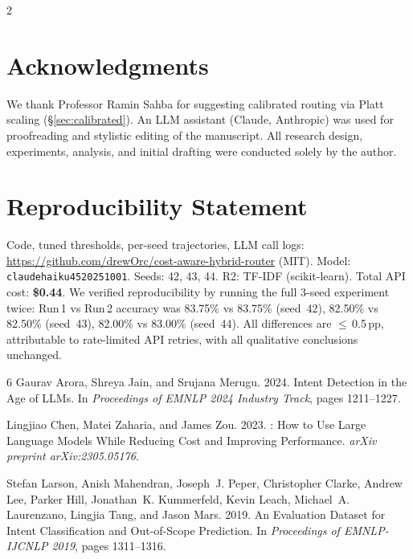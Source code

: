 \documentclass[11pt,a4paper]{article}
\begin{document}
\begin{multicols}{2}
\section*{Acknowledgments}

We thank Professor Ramin Sahba for suggesting calibrated routing via Platt scaling (\S\ref{sec:calibrated}). An LLM assistant (Claude, Anthropic) was used for proofreading and stylistic editing of the manuscript. All research design, experiments, analysis, and initial drafting were conducted solely by the author.

\section*{Reproducibility Statement}

Code, tuned thresholds, per-seed trajectories, LLM call logs: \url{https://github.com/drewOrc/cost-aware-hybrid-router} (MIT). Model: \texttt{claude\text{-}haiku\text{-}4\text{-}5\text{-}20251001}. Seeds: 42, 43, 44. R2: TF-IDF (scikit-learn). Total API cost: \textbf{\$0.44}. We verified reproducibility by running the full 3-seed experiment twice: Run\,1 vs Run\,2 accuracy was 83.75\% vs 83.75\% (seed~42), 82.50\% vs 82.50\% (seed~43), 82.00\% vs 83.00\% (seed~44). All differences are $\leq$\,0.5\,pp, attributable to rate-limited API retries, with all qualitative conclusions unchanged.


\begin{thebibliography}{6}
Gaurav Arora, Shreya Jain, and Srujana Merugu. 2024.
\newblock Intent Detection in the Age of {LLMs}.
\newblock In \emph{Proceedings of EMNLP 2024 Industry Track}, pages 1211--1227.

Lingjiao Chen, Matei Zaharia, and James Zou. 2023.
: How to Use Large Language Models While Reducing Cost and Improving Performance.
\newblock \emph{arXiv preprint arXiv:2305.05176}.

Stefan Larson, Anish Mahendran, Joseph~J. Peper, Christopher Clarke, Andrew Lee, Parker Hill, Jonathan~K. Kummerfeld, Kevin Leach, Michael~A. Laurenzano, Lingjia Tang, and Jason Mars. 2019.
\newblock An Evaluation Dataset for Intent Classification and Out-of-Scope Prediction.
\newblock In \emph{Proceedings of EMNLP-IJCNLP 2019}, pages 1311--1316.


\end{thebibliography}
\end{multicols}
\end{document}
